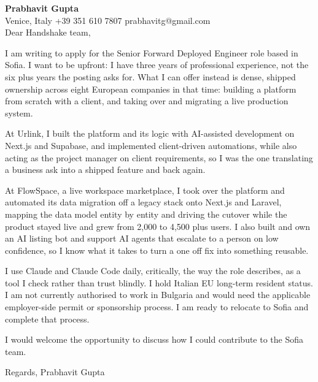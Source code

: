 \documentclass[a4paper,10.5pt]{article}
\begin{document}
\textbf{Prabhavit Gupta}\\
Venice, Italy \textbar{} +39 351 610 7807 \textbar{} prabhavitg@gmail.com\\[10pt]
Dear Handshake team,

I am writing to apply for the Senior Forward Deployed Engineer role based in Sofia. I want to be upfront: I have three years of professional experience, not the six plus years the posting asks for. What I can offer instead is dense, shipped ownership across eight European companies in that time: building a platform from scratch with a client, and taking over and migrating a live production system.

At Urlink, I built the platform and its logic with AI-assisted development on Next.js and Supabase, and implemented client-driven automations, while also acting as the project manager on client requirements, so I was the one translating a business ask into a shipped feature and back again.

At FlowSpace, a live workspace marketplace, I took over the platform and automated its data migration off a legacy stack onto Next.js and Laravel, mapping the data model entity by entity and driving the cutover while the product stayed live and grew from 2,000 to 4,500 plus users. I also built and own an AI listing bot and support AI agents that escalate to a person on low confidence, so I know what it takes to turn a one off fix into something reusable.

I use Claude and Claude Code daily, critically, the way the role describes, as a tool I check rather than trust blindly. I hold Italian EU long-term resident status. I am not currently authorised to work in Bulgaria and would need the applicable employer-side permit or sponsorship process. I am ready to relocate to Sofia and complete that process.

I would welcome the opportunity to discuss how I could contribute to the Sofia team.

Regards,
Prabhavit Gupta
\end{document}
